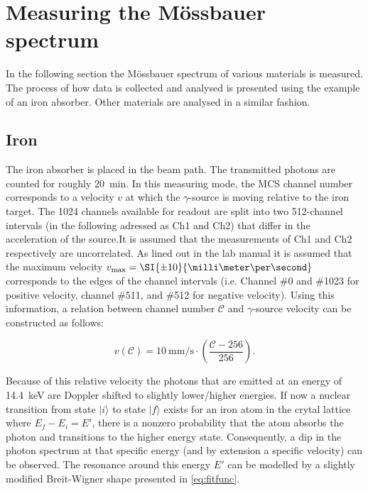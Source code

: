 
\section{Measuring the Mössbauer spectrum}
\label{sec:mössbauer-spectrum}

In the following section the Mössbauer spectrum of various materials is measured. The
process of how data is collected and analysed is presented using the example of an 
iron absorber. Other materials are analysed in a similar fashion.

\subsection{Iron}
\label{ssec:iron}

The iron absorber is placed in the beam path. The transmitted photons are counted for
roughly \SI{20}{\minute}. In this measuring mode, the MCS channel number corresponds
to a velocity $v$ at which the $\gamma$-source is moving relative to the iron target.
The 1024 channels available for readout are split into two 512-channel intervals (in 
the following adressed as Ch1 and Ch2) that differ in the acceleration of the source.It is assumed that the measurements of Ch1 and Ch2 respectively are uncorrelated.
As lined out in the lab manual \cite{Sch17} it is assumed that the maximum velocity 
$v_\text{max}=\SI{\pm10}{\milli\meter\per\second}$ corresponds to the edges of the 
channel intervals (i.e. Channel \#0 and \#1023 for positive velocity, channel \#511, 
and \#512 for negative velocity). Using this information, a relation between channel 
number $\mathcal{C}$ and $\gamma$-source velocity can be constructed as follows:

\begin{equation}
\label{eq:channel-to-velocity}
v(\mathcal{C}) = \SI{10}{\milli\meter\per\second}\cdot\left(\frac{\mathcal{C}-256}{256}\right).
\end{equation}

Because of this relative velocity the photons that are emitted at an energy of 
\SI{14.4}{\kilo\electronvolt} are Doppler shifted to slightly lower/higher energies.
If now a nuclear transition from state $|i\rangle$ to state $|f\rangle$ exists for an
iron atom in the crytal lattice where $E_f-E_i=E'$, there is a nonzero probability 
that the atom absorbs the photon and transitions to the higher energy state. 
Consequently, a dip in the photon spectrum at that specific energy (and by extension 
a specific velocity) can be observed. The resonance around this energy $E'$ can be 
modelled by a slightly modified Breit-Wigner shape presented in \autoref{eq:fitfunc}.


